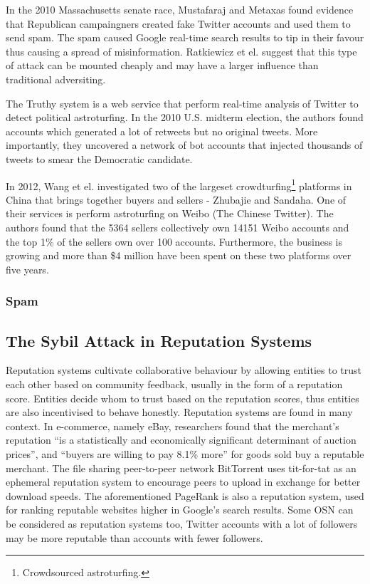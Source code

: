 In the 2010 Massachusetts senate race, Mustafaraj and Metaxas found evidence
that Republican campaingners created fake Twitter accounts and used them to send
spam. The spam caused Google real-time search results to tip in their favour
thus causing a spread of misinformation\cite{mustafaraj2010obscurity}.
Ratkiewicz et el. suggest that this type of attack can be mounted cheaply and
may have a larger influence than traditional
adversiting\cite{ratkiewicz2011truthy}.

The Truthy system\cite{ratkiewicz2011truthy} is a web service that perform
real-time analysis of Twitter to detect political astroturfing. In the 2010
U.S. midterm election, the authors found accounts which generated a lot of
retweets but no original tweets. More importantly, they uncovered a network of
bot accounts that injected thousands of tweets to smear the Democratic candidate.

In 2012, Wang et el. investigated two of the largeset
crowdturfing\footnote{Crowdsourced astroturfing.} platforms in China that brings
together buyers and sellers - Zhubajie and Sandaha. One of their services is
perform astroturfing on Weibo (The Chinese Twitter). The authors found that the
5364 sellers collectively own 14151 Weibo accounts and the top 1\% of the
sellers own over 100 accounts. Furthermore, the business is growing and more
than \$4 million have been spent on these two platforms over five
years\cite{wang2012serf}.


\subsubsection{Spam}
\cite{stringhini2010detecting}
\cite{gao2010detecting}
\cite{yang2012analyzing}

\subsection{The Sybil Attack in Reputation Systems}
Reputation systems cultivate collaborative behaviour by allowing entities to
trust each other based on community feedback, usually in the form of a
reputation score. Entities decide whom to trust based on the reputation scores,
thus entities are also incentivised to behave honestly. Reputation systems are
found in many context. In e-commerce, namely eBay, researchers found that the
merchant's reputation ``is a statistically and economically significant
determinant of auction prices''\cite{houser2006reputation}, and ``buyers are
willing to pay 8.1\% more'' for goods sold buy a reputable
merchant\cite{resnick2006value}. The file sharing peer-to-peer network
BitTorrent uses tit-for-tat as an ephemeral reputation system to encourage peers
to upload in exchange for better download speeds\cite{cohen2003incentives}. The
aforementioned PageRank\cite{page1999pagerank} is also a reputation system, used
for ranking reputable websites higher in Google's search results. Some OSN can
be considered as reputation systems too, Twitter accounts with a lot of
followers may be more reputable than accounts with fewer followers.

